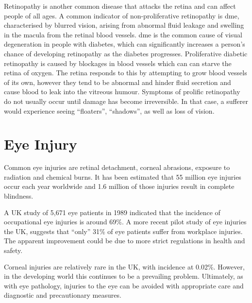 Retinopathy is another common disease that attacks the retina and 
can affect people of all ages. A common indicator of non-proliferative
retinopathy is \Gls{dme}, characterised by blurred vision, arising from
abnormal fluid leakage and swelling in the macula from the retinal
blood vessels.\cite{hee1995quantitative} \gls{dme} is the common
cause of visual degeneration in people with diabetes, which can
significantly increases a person's chance of developing retinopathy as
the diabetes progresses.\cite{klein1984wisconsin} Proliferative diabetic
retinopathy is caused by blockages in blood vessels which can can starve
the retina of oxygen. The retina responds to this by attempting to grow blood
vessels of its own, however they tend to be abnormal and hinder fluid
secretion and cause blood to leak into the  vitreous humour. Symptoms
of prolific retinopathy do not usually occur  until damage has become
irreversible. In that case, a sufferer would experience seeing
\enquote{floaters}, \enquote{shadows}, as well as loss of vision.

\section{Eye Injury}

Common eye injuries are retinal detachment, corneal abrasions, exposure to
radiation and chemical burns. It has been estimated that 55 million eye injuries
occur each year worldwide and 1.6 million of those injuries result in complete
blindness.\cite{negrel1998global}

A UK study of 5,671 eye patients in 1989 indicated that the incidence of
occupational eye injuries is around 69\%.\cite{macewen1989eye} A more
recent pilot study of eye injuries the UK, suggests that \enquote{only} 31\%
of eye patients suffer from workplace injuries.\cite{thompson2009occupational}
The apparent improvement could be due to more strict regulations in health
and safety.

Corneal injuries are relatively rare in the UK, with incidence at
0.02\%.\cite{macdonald2009surveillance} However, in the developing
world this continues to be a prevailing problem.\cite{whitcher2001corneal}
Ultimately, as with eye pathology, injuries to the eye can be avoided with
appropriate care and diagnostic and precautionary measures.
